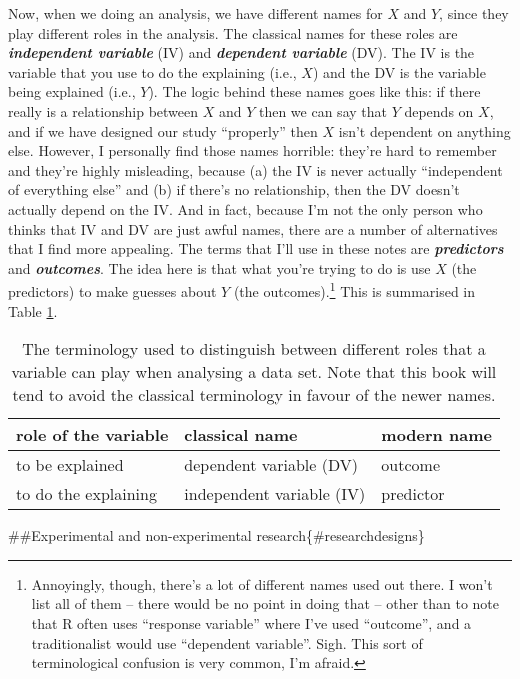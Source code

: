\documentclass[]{book}
\begin{document}
Now, when we doing an analysis, we have different names for \(X\) and \(Y\), since they play different roles in the analysis. The classical names for these roles are \textbf{\emph{independent variable}} (IV) and \textbf{\emph{dependent variable}} (DV). The IV is the variable that you use to do the explaining (i.e., \(X\)) and the DV is the variable being explained (i.e., \(Y\)). The logic behind these names goes like this: if there really is a relationship between \(X\) and \(Y\) then we can say that \(Y\) depends on \(X\), and if we have designed our study ``properly'' then \(X\) isn't dependent on anything else. However, I personally find those names horrible: they're hard to remember and they're highly misleading, because (a) the IV is never actually ``independent of everything else'' and (b) if there's no relationship, then the DV doesn't actually depend on the IV. And in fact, because I'm not the only person who thinks that IV and DV are just awful names, there are a number of alternatives that I find more appealing. The terms that I'll use in these notes are \textbf{\emph{predictors}} and \textbf{\emph{outcomes}}. The idea here is that what you're trying to do is use \(X\) (the predictors) to make guesses about \(Y\) (the outcomes).\footnote{Annoyingly, though, there's a lot of different names used out there. I won't list all of them -- there would be no point in doing that -- other than to note that R often uses ``response variable'' where I've used ``outcome'', and a traditionalist would use ``dependent variable''. Sigh. This sort of terminological confusion is very common, I'm afraid.} This is summarised in Table \ref{tab:ivdv}.

\begin{table}

\caption{\label{tab:ivdv}The terminology used to distinguish between different roles that a variable can play when analysing a data set. Note that this book will tend to avoid the classical terminology in favour of the newer names.}
\centering
\begin{tabular}[t]{lll}
\toprule
role of the variable & classical name & modern name\\
\midrule
to be explained & dependent variable (DV) & outcome\\
to do the explaining & independent variable (IV) & predictor\\
\bottomrule
\end{tabular}
\end{table}

\#\#Experimental and non-experimental research\{\#researchdesigns\}
\end{document}
